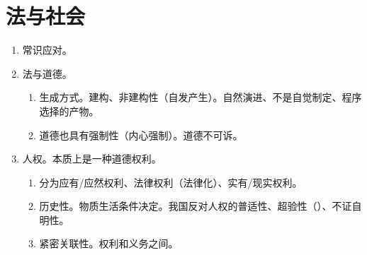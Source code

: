 \section{法与社会}
\begin{enumerate}
  \item 常识应对。
  \item 法与道德。
        \begin{enumerate}
          \item 生成方式。建构、非建构性（自发产生）。自然演进、不是自觉制定、程序选择的产物。
          \item 道德也具有强制性（内心强制）。道德不可诉。
        \end{enumerate}
  \item 人权。本质上是一种道德权利。
        \begin{enumerate}
          \item 分为应有/应然权利、法律权利（法律化）、实有/现实权利。
          \item 历史性。物质生活条件决定。我国反对人权的普适性、超验性（）、不证自明性。
          \item 紧密关联性。权利和义务之间。
        \end{enumerate}
\end{enumerate}
